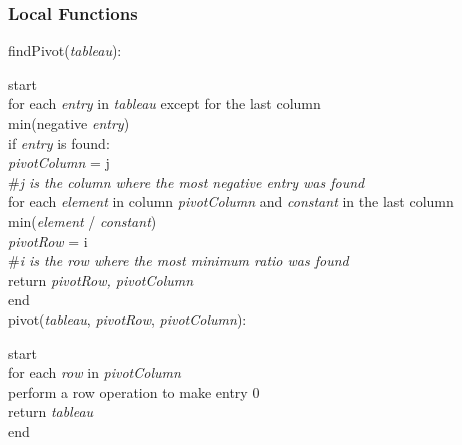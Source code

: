 \documentclass[12pt, titlepage]{article}
\begin{document}
\subsubsection{Local Functions}

\noindent 
findPivot(\textit{tableau}):

\hspace*{0.3cm} start \\
\hspace*{2cm} for each \textit{entry} in \textit{tableau} except for the last 
column \\
\hspace*{3cm} min(negative \textit{entry}) \\
\hspace*{3cm} if \textit{entry} is found: \\
\hspace*{4cm} \textit{pivotColumn} = j \\
\hspace*{4cm} \textcolor{pyComment}{\#\textit{j is the column where the most 
negative entry was found}} \\
\hspace*{2cm} for each \textit{element} in column \textit{pivotColumn} and 
\textit{constant} in the last column\\
\hspace*{3cm} min(\textit{element} / \textit{constant}) \\
\hspace*{3cm} \textit{pivotRow} = i \\
\hspace*{3cm} \textcolor{pyComment}{\#\textit{i is the row where the most 
minimum ratio was found}} \\
\hspace*{2cm} return \textit{pivotRow, pivotColumn} \\
\hspace*{0.9cm} end \\

\noindent 
pivot(\textit{tableau}, \textit{pivotRow}, \textit{pivotColumn}):

\hspace*{0.3cm} start \\
\hspace*{2cm} for each \textit{row} in \textit{pivotColumn} \\
\hspace*{3cm} perform a row operation to make entry 0 \\
\hspace*{2cm} return \textit{tableau} \\
\hspace*{0.9cm} end \\
\end{document}
